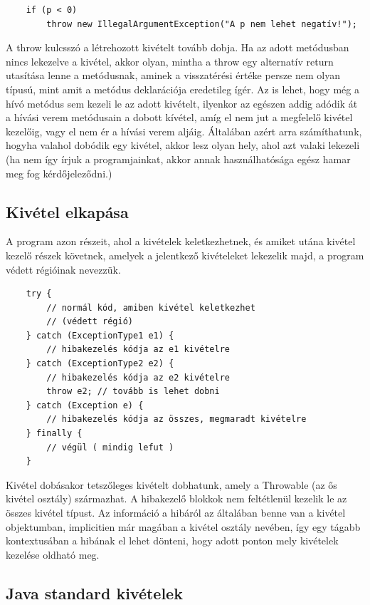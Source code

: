\documentclass[margin=0px]{article}
\begin{document}
\begin{verbatim}
    if (p < 0) 
        throw new IllegalArgumentException("A p nem lehet negatív!");
\end{verbatim}

A throw kulcsszó a létrehozott kivételt tovább dobja. Ha az adott metódusban nincs lekezelve a kivétel, akkor olyan, mintha a throw egy alternatív return utasítása lenne a metódusnak, aminek a visszatérési értéke persze nem olyan típusú, mint amit a metódus deklarációja eredetileg ígér. Az is lehet, hogy még a hívó metódus sem kezeli le az adott kivételt, ilyenkor az egészen addig adódik át a hívási verem metódusain a dobott kívétel, amíg el nem jut a megfelelő kivétel kezelőig, vagy el nem ér a hívási verem aljáig. Általában azért arra számíthatunk, hogyha valahol dobódik egy kivétel, akkor lesz olyan hely, ahol azt valaki lekezeli (ha nem így írjuk a programjainkat, akkor annak használhatósága egész hamar meg fog kérdőjeleződni.)

\subsection{Kivétel elkapása}
A program azon részeit, ahol a kivételek keletkezhetnek, és amiket utána kivétel kezelő részek követnek, amelyek a jelentkező kivételeket lekezelik majd, a program védett régióinak nevezzük.

\begin{verbatim}
    try {
        // normál kód, amiben kivétel keletkezhet
        // (védett régió)
    } catch (ExceptionType1 e1) {
        // hibakezelés kódja az e1 kivételre
    } catch (ExceptionType2 e2) {
        // hibakezelés kódja az e2 kivételre
        throw e2; // tovább is lehet dobni
    } catch (Exception e) {
        // hibakezelés kódja az összes, megmaradt kivételre
    } finally {
        // végül ( mindig lefut )
    }
\end{verbatim}

Kivétel dobásakor tetszőleges kivételt dobhatunk, amely a Throwable (az ős kivétel osztály) származhat. A hibakezelő blokkok nem feltétlenül kezelik le az összes kivétel típust. Az információ a hibáról az általában benne van a kivétel objektumban, implicitien már magában a kivétel osztály nevében, így egy tágabb kontextusában a hibának el lehet dönteni, hogy adott ponton mely kivételek kezelése oldható meg.

\subsection{Java standard kivételek}
\end{document}
